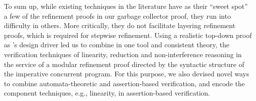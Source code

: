 To sum up, while existing techniques in the literature have as their
``sweet spot'' a few of the refinement proofs in our garbage collector
proof, they run into difficulty in others. 
More critically, they
do not facilitate layering refinement proofs, which is required for stepwise
refinement. 
Using a realistic top-down proof as \civl's design driver led us to
combine in one tool and consistent theory, the verification techniques
of linearity, reduction and non-interference reasoning in the service
of a modular refinement proof directed by the syntactic structure of
the imperative concurrent program. 
For this purpose, we also devised
novel ways to combine automata-theoretic and assertion-based
verification, and encode the component techniques, e.g., linearity, in
assertion-based verification. 

